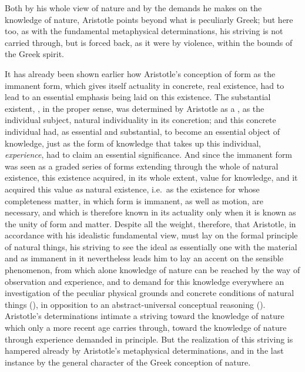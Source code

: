Both by his whole view of nature and by the demands he makes on the
knowledge of nature, Aristotle points beyond what is peculiarly Greek;
but here too, as with the fundamental metaphysical determinations, his
striving is not carried through, but is forced back, as it were by
violence, within the bounds of the Greek spirit.

It has already been shown earlier how Aristotle's conception of form as
the immanent form, which gives itself actuality in concrete, real
existence, had to lead to an essential emphasis being laid on this
existence. The substantial existent, , in the proper
sense, was determined by Aristotle as a , as the individual
subject, natural individuality in its concretion; and this concrete
individual had, as essential and substantial, to become an essential
object of knowledge, just as the form of knowledge that takes up this
individual, \emph{experience}, had to claim an essential significance.
And since the immanent form was seen as a graded series of forms
extending through the whole of natural existence, this existence
acquired, in its whole extent, value for knowledge, and it acquired
this value \emph{as} natural existence, i.e.\ as the existence for whose
completeness matter, in which form is immanent, as well as motion, are
necessary, and which is therefore known in its actuality only when it
is known as the unity of form and matter. Despite all the weight,
therefore, that Aristotle, in accordance with his idealistic
fundamental view, must lay on the formal principle of natural things,
his striving to see the ideal as essentially one with the material and
as immanent in it nevertheless leads him to lay an accent on the
sensible phenomenon, from which alone knowledge of nature can be
reached by the way of observation and experience, and to demand for
this knowledge everywhere an investigation of the peculiar physical
grounds and concrete conditions of natural things (), in
opposition to an abstract-universal conceptual reasoning ().
Aristotle's determinations intimate a striving toward the knowledge of
nature which only a more recent age carries through, toward the
knowledge of nature through experience demanded in principle. But the
realization of this striving is hampered already by Aristotle's
metaphysical determinations, and in the last instance by the general
character of the Greek conception of nature.

